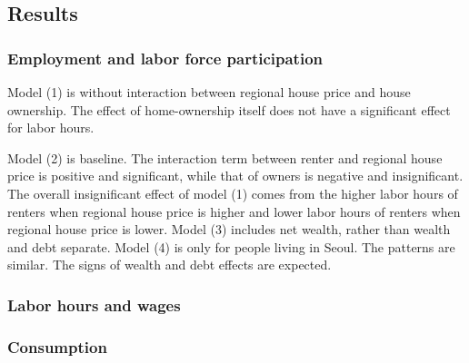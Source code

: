 \documentclass[12pt,letterpaper]{article}
\begin{document}
\subsection{Results}
\subsubsection{Employment and labor force participation}



Model (1) is without interaction between regional house price and house ownership. The effect of home-ownership itself does not have a significant effect for labor hours.

Model (2) is baseline. The interaction term between renter and regional house price is positive and significant, while that of owners is negative and insignificant. The overall insignificant effect of model (1) comes from the higher labor hours of renters when regional house price is higher and lower labor hours of renters when regional house price is lower. Model (3) includes net wealth, rather than wealth and debt separate. Model (4) is only for people living in Seoul. The patterns are similar. The signs of wealth and debt effects are expected. 
\newpage
\subsubsection{Labor hours and wages}





\newpage
\subsubsection{Consumption}


\clearpage


\clearpage
\end{document}
